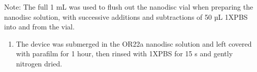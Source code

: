 \documentclass[
  a4paper,
]{scrbook}
\providecommand{\tightlist}{%
  \setlength{\itemsep}{0pt}\setlength{\parskip}{0pt}}\usepackage{longtable,booktabs,array}
\begin{document}
Note: The full 1 mL was used to flush out the nanodisc vial when
preparing the nanodisc solution, with successive additions and
subtractions of 50 µL 1XPBS into and from the vial.

\begin{enumerate}
\def\labelenumi{\arabic{enumi}.}
\setcounter{enumi}{6}
\tightlist
\item
  The device was submerged in the OR22a nanodisc solution and left
  covered with parafilm for 1 hour, then rinsed with 1XPBS for 15 s and
  gently nitrogen dried.
\end{enumerate}

\begin{figure}

\begin{minipage}[t]{0.03\linewidth}

{\centering 


}

\end{minipage}%
%
\begin{minipage}[t]{0.01\linewidth}

{\centering 

~

}

\end{minipage}%
%
\begin{minipage}[t]{0.45\linewidth}

{\centering 

}
\end{minipage}
\end{figure}
\end{document}
